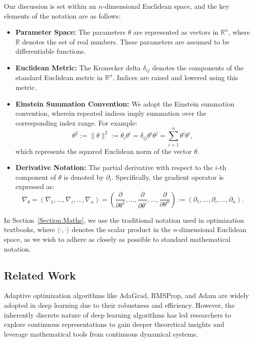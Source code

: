 \documentclass{article} %
\begin{document}
Our discussion is set within an \( n \)-dimensional Euclidean space, and the key elements of the notation are as follows:
\begin{itemize}
    \item \textbf{Parameter Space:} The parameters \( \theta \) are represented as vectors in \( \mathbb{R}^n \), where \( \mathbb{R} \) denotes the set of real numbers. These parameters are assumed to be differentiable functions.
    
    \item \textbf{Euclidean Metric:} The Kronecker delta \( \delta_{ij} \) denotes the components of the standard Euclidean metric in \( \mathbb{R}^n \). Indices are raised and lowered using this metric.
    
    \item \textbf{Einstein Summation Convention:} We adopt the Einstein summation convention, wherein repeated indices imply summation over the corresponding index range. For example:
    \[
    \theta^2 := \|\theta\|^2 := \theta_i \theta^i = \delta_{ij} \theta^i \theta^j = \sum_{i=1}^n \theta^i \theta^i,
    \]
    which represents the squared Euclidean norm of the vector \( \theta \).

    \item \textbf{Derivative Notation:} The partial derivative with respect to the \( i \)-th component of \( \theta \) is denoted by \( \partial_i \). Specifically, the gradient operator is expressed as:
    \[
    \nabla_\theta =  \left(\nabla_1, \ldots, \nabla_i, \ldots, \nabla_n\right) = \left(\frac{\partial}{\partial \theta^1}, \ldots, \frac{\partial}{\partial \theta^i}, \ldots, \frac{\partial}{\partial \theta^n}\right) :=  \left(\partial_1, \ldots, \partial_i, \ldots, \partial_n\right).
    \]
\end{itemize}

In Section~\ref{Section:Maths}, we use the traditional notation used in optimization textbooks, where $\langle \cdot,\cdot \rangle$ denotes the scalar product in the $n$-dimensional Euclidean space, as we wish to adhere as closely as possible to standard mathematical notation.

\subsection{Related Work}

Adaptive optimization algorithms like AdaGrad, RMSProp, and Adam are widely adopted in deep learning due to their robustness and efficiency. However, the inherently discrete nature of deep learning algorithms has led researchers to explore continuous representations to gain deeper theoretical insights and leverage mathematical tools from continuous dynamical systems.
\end{document}
